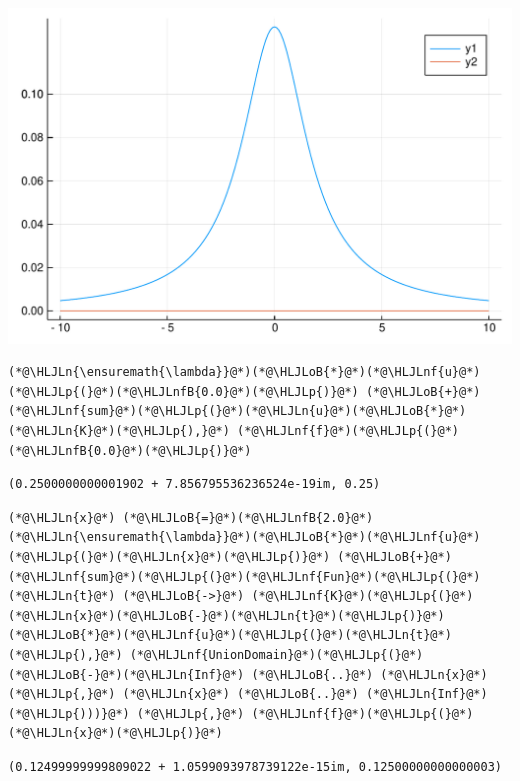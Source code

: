 \documentclass[12pt,a4paper]{article}
\newcommand{\HLJLn}[1]{#1}
\newcommand{\HLJLnf}[1]{\textcolor[RGB]{66,102,213}{#1}}
\newcommand{\HLJLnfB}[1]{\textcolor[RGB]{59,151,46}{#1}}
\newcommand{\HLJLoB}[1]{\textcolor[RGB]{102,102,102}{\textbf{#1}}}
\newcommand{\HLJLp}[1]{#1}
\begin{document}
\includegraphics[width=\linewidth]{figures/Lecture28_3_1.pdf}

\begin{lstlisting}
(*@\HLJLn{\ensuremath{\lambda}}@*)(*@\HLJLoB{*}@*)(*@\HLJLnf{u}@*)(*@\HLJLp{(}@*)(*@\HLJLnfB{0.0}@*)(*@\HLJLp{)}@*) (*@\HLJLoB{+}@*)  (*@\HLJLnf{sum}@*)(*@\HLJLp{(}@*)(*@\HLJLn{u}@*)(*@\HLJLoB{*}@*)(*@\HLJLn{K}@*)(*@\HLJLp{),}@*) (*@\HLJLnf{f}@*)(*@\HLJLp{(}@*)(*@\HLJLnfB{0.0}@*)(*@\HLJLp{)}@*)
\end{lstlisting}

\begin{lstlisting}
(0.2500000000001902 + 7.856795536236524e-19im, 0.25)
\end{lstlisting}


\begin{lstlisting}
(*@\HLJLn{x}@*) (*@\HLJLoB{=}@*)(*@\HLJLnfB{2.0}@*)
(*@\HLJLn{\ensuremath{\lambda}}@*)(*@\HLJLoB{*}@*)(*@\HLJLnf{u}@*)(*@\HLJLp{(}@*)(*@\HLJLn{x}@*)(*@\HLJLp{)}@*) (*@\HLJLoB{+}@*)  (*@\HLJLnf{sum}@*)(*@\HLJLp{(}@*)(*@\HLJLnf{Fun}@*)(*@\HLJLp{(}@*)(*@\HLJLn{t}@*) (*@\HLJLoB{->}@*) (*@\HLJLnf{K}@*)(*@\HLJLp{(}@*)(*@\HLJLn{x}@*)(*@\HLJLoB{-}@*)(*@\HLJLn{t}@*)(*@\HLJLp{)}@*)(*@\HLJLoB{*}@*)(*@\HLJLnf{u}@*)(*@\HLJLp{(}@*)(*@\HLJLn{t}@*)(*@\HLJLp{),}@*) (*@\HLJLnf{UnionDomain}@*)(*@\HLJLp{(}@*)(*@\HLJLoB{-}@*)(*@\HLJLn{Inf}@*) (*@\HLJLoB{..}@*) (*@\HLJLn{x}@*)(*@\HLJLp{,}@*) (*@\HLJLn{x}@*) (*@\HLJLoB{..}@*) (*@\HLJLn{Inf}@*)(*@\HLJLp{)))}@*) (*@\HLJLp{,}@*) (*@\HLJLnf{f}@*)(*@\HLJLp{(}@*)(*@\HLJLn{x}@*)(*@\HLJLp{)}@*)
\end{lstlisting}

\begin{lstlisting}
(0.12499999999809022 + 1.0599093978739122e-15im, 0.12500000000000003)
\end{lstlisting}
\end{document}
